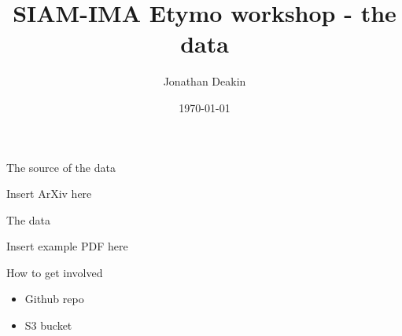 \documentclass{beamer}
\begin{document}
\title{SIAM-IMA Etymo workshop - the data}
\author{Jonathan Deakin}
\date{\today}

\begin{frame}
  \maketitle
\end{frame}

\begin{frame}{The source of the data}
  \begin{center}
    Insert ArXiv here
  \end{center}
\end{frame}

\begin{frame}{The data}
  \begin{center}
    Insert example PDF here
  \end{center}
\end{frame}

\begin{frame}{How to get involved}
  \begin{center}
    \begin{itemize}
      \item<1-> Github repo
      \item<2-> S3 bucket
    \end{itemize}
  \end{center}
\end{frame}
\end{document}
